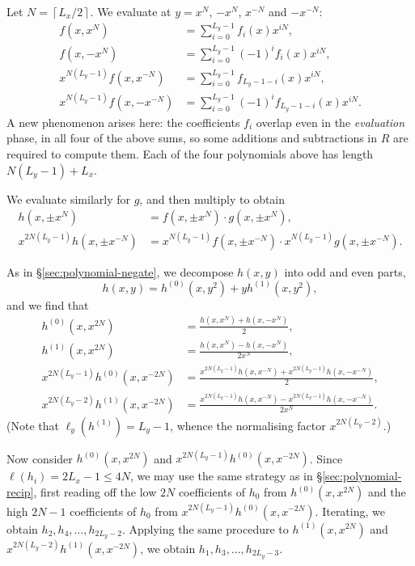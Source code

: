 \documentclass{amsart}
\newcommand{\ceil}[1]{\left\lceil{#1}\right\rceil}
\theoremstyle{definition}
\theoremstyle{remark}
\begin{document}
Let $N = \ceil{L_x/2}$. We evaluate at $y = x^N$, $-x^N$, $x^{-N}$ and $-x^{-N}$:
\begin{align*}
  f(x, x^N) & = \sum_{i=0}^{L_y - 1} f_i(x) x^{iN}, \\
  f(x, -x^N) & = \sum_{i=0}^{L_y - 1} (-1)^i f_i(x) x^{iN}, \\
  x^{N(L_y - 1)} f(x, x^{-N}) & = \sum_{i=0}^{L_y - 1} f_{L_y-1-i}(x) x^{iN}, \\
  x^{N(L_y - 1)} f(x, -x^{-N}) & = \sum_{i=0}^{L_y - 1} (-1)^i f_{L_y-1-i}(x) x^{iN}.
\end{align*}
A new phenomenon arises here: the coefficients $f_i$ overlap even in the \emph{evaluation} phase, in all four of the above sums, so some additions and subtractions in $R$ are required to compute them. Each of the four polynomials above has length $N(L_y - 1) + L_x$.

We evaluate similarly for $g$, and then multiply to obtain
\begin{align*}
  h(x, \pm x^N) & = f(x, \pm x^N) \cdot g(x, \pm x^N), \\
  x^{2N(L_y - 1)} h(x, \pm x^{-N}) & = x^{N(L_y - 1)} f(x, \pm x^{-N}) \cdot x^{N(L_y - 1)} g(x, \pm x^{-N}).
\end{align*}

As in \S\ref{sec:polynomial-negate}, we decompose $h(x, y)$ into odd and even parts,
  \[ h(x, y) = h^{(0)}(x, y^2) + y h^{(1)}(x, y^2), \]
and we find that
\begin{align*}
  h^{(0)}(x, x^{2N}) & = \frac{h(x, x^N) + h(x, -x^N)}{2}, \\
  h^{(1)}(x, x^{2N}) & = \frac{h(x, x^N) - h(x, -x^N)}{2x^N}, \\
  x^{2N(L_y - 1)} h^{(0)}(x, x^{-2N}) & = \frac{x^{2N(L_y - 1)} h(x, x^{-N}) + x^{2N(L_y - 1)} h(x, -x^{-N})}{2}, \\
  x^{2N(L_y - 2)} h^{(1)}(x, x^{-2N}) & = \frac{x^{2N(L_y - 1)} h(x, x^{-N}) - x^{2N(L_y - 1)} h(x, -x^{-N})}{2x^N}.
\end{align*}
(Note that $\ell_y(h^{(1)}) = L_y - 1$, whence the normalising factor $x^{2N(L_y-2)}$.)

Now consider $h^{(0)}(x, x^{2N})$ and $x^{2N(L_y - 1)} h^{(0)}(x, x^{-2N})$. Since $\ell(h_i) = 2L_x - 1 \leq 4N$, we may use the same strategy as in \S\ref{sec:polynomial-recip}, first reading off the low $2N$ coefficients of $h_0$ from $h^{(0)}(x, x^{2N})$ and the high $2N - 1$ coefficients of $h_0$ from $x^{2N(L_y - 1)} h^{(0)}(x, x^{-2N})$. Iterating, we obtain $h_2, h_4, \ldots, h_{2L_y-2}$. Applying the same procedure to $h^{(1)}(x, x^{2N})$ and $x^{2N(L_y - 2)} h^{(1)}(x, x^{-2N})$, we obtain $h_1, h_3, \ldots, h_{2L_y-3}$.
\end{document}
